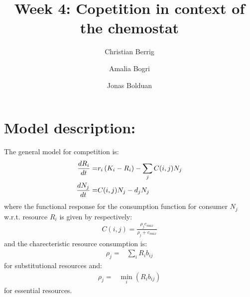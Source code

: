 \documentclass{article}
\author{Christian Berrig \and Amalia Bogri \and Jonas Bolduan}
\title{Week 4: Copetition in context of the chemostat}
\begin{document}
\maketitle


\section*{Model description:}
The general model for competition is:
\begin{align*}
\dv{R_{i}}{t} =& r_{i} \left( K_{i} - R_{i} \right) - \sum_{j} C(i, j) N_{j} \\
\dv{N_{j}}{t} =& C(i, j) N_{j} - d_{j} N_{j} \\
\end{align*}
where the functional response for the consumption function for consumer $N_{j}$ w.r.t. resource $R_{i}$ is given by respectively:
\begin{align*}
C(i,j) = \frac{\rho_{j} c_{max}}{\rho_{j} + c_{max}}
\end{align*}
and the charecteristic resource consumption is:
\begin{align*}
\rho_{j} =& \sum_{i} R_{i} b_{ij} 
\end{align*}
for substitutional resources and:
\begin{align*}
\rho_{j} =& \min_{i} \left( R_{i} b_{ij} \right)
\end{align*}
for essential resources.



\printbibliography
\end{document}

